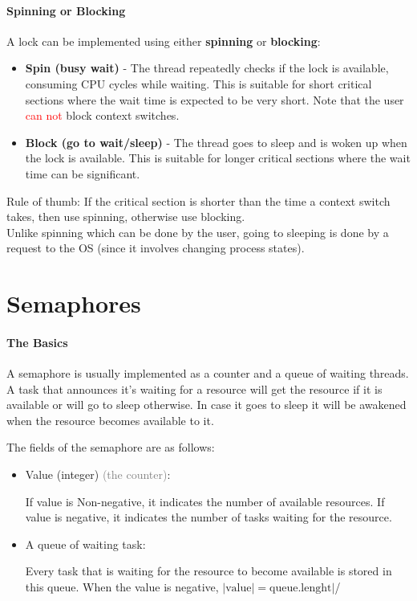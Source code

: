 \documentclass[openany,12pt]{book}
\newcommand{\red}[1]{\textcolor{Red}{#1}}
\newcommand{\gray}[1]{\textcolor{gray}{#1}}
\begin{document}
\paragraph{Spinning or Blocking} A lock can be implemented using either \textbf{spinning} or \textbf{blocking}:
\begin{itemize}
  \item \textbf{Spin (busy wait)} - The thread repeatedly checks if the lock is available, consuming CPU cycles while waiting. This is suitable for short critical sections where the wait time is expected to be very short. Note that the user \red{can not} block context switches.

  \item \textbf{Block (go to wait/sleep)} - The thread goes to sleep and is woken up when the lock is available. This is suitable for longer critical sections where the wait time can be significant.
\end{itemize}
Rule of thumb: If the critical section is shorter than the time a context switch takes, then use spinning, otherwise use blocking.\\
Unlike spinning which can be done by the user, going to sleeping is done by a request to the OS (since it involves changing process states).



\section*{Semaphores}

\paragraph{The Basics} A semaphore is usually implemented as a counter and a queue of waiting threads. A task that announces it's waiting for a resource will get the resource if it is available or will go to sleep otherwise. In case it goes to sleep it will be awakened when the resource becomes available to it.

The fields of the semaphore are as follows:
\begin{itemize}
  \item Value (integer) \gray{(the counter)}:\par
        If value is Non-negative, it indicates the number of available resources. If value is negative, it indicates the number of tasks waiting for the resource.

  \item A queue of waiting task: \par
        Every task that is waiting for the resource to become available is stored in this queue. When the value is negative, \(|\text{value}| = \text{queue.lenght}|\)/

\end{itemize}
\end{document}
